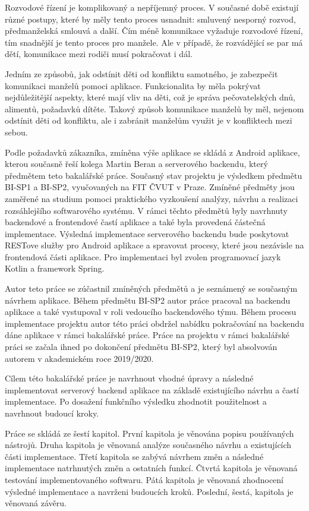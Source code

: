 Rozvodové řízení je komplikovaný a nepříjemný proces. V současné době existují různé postupy, které by měly tento proces usnadnit: smluvený nesporný rozvod, předmanželská smlouvá a další. Čím méně komunikace vyžaduje rozvodové řízení, tím snadnější je tento proces pro manžele. Ale v případě, že rozvádějící se par má dětí, komunikace mezi rodiči musí pokračovat i dál. 

Jedním ze způsobů, jak odstínit děti od konfliktu samotného, je zabezpečit komunikaci manželů pomoci aplikace. Funkcionalita by měla pokrývat nejdůležitější aspekty, které mají vliv na děti, což je správa pečovatelských dnů, alimentů, požadavků dítěte. Takový způsob komunikace manželů by měl, nejenom odstínit děti od konfliktu, ale i zabránit manželům využit je v konfliktech mezi sebou.

Podle požadavků zákazníka, zmíněna výše aplikace se skládá z Android aplikace, kterou současně řeší kolega Martin Beran a serverového backendu, který předmětem teto bakalářské práce. Současný stav projektu je výsledkem předmětu BI-SP1 a BI-SP2, vyučovaných na FIT ČVUT v Praze. Zmíněné předměty jsou zaměřené na studium pomoci praktického vyzkoušení analýzy, návrhu a realizaci rozsáhlejšího softwarového systému. V rámci těchto předmětů byly navrhnuty backendové a frontendové častí aplikace a také byla provedená částečná implementace. 
Výsledná implementace serverového backendu bude poskytovat RESTove služby pro Android aplikace a spravovat procesy, které jsou nezávisle na frontendová části aplikace. Pro implementaci byl zvolen programovací jazyk Kotlin a framework Spring. 

Autor teto práce se zúčastnil zmíněných předmětů a je seznámený se současným návrhem aplikace. Během předmětu BI-SP2 autor práce pracoval na backendu aplikace a také vystupoval v roli vedoucího backendového týmu. Během procesu implementace projektu autor této práci obdržel nabídku pokračování na backendu dáne aplikace v rámci bakalářské práce. Práce na projektu v rámci bakalářské práci se začala ihned po dokončení předmětu BI-SP2, který byl absolvován autorem v akademickém roce 2019/2020.

Cílem této bakalářské práce je navrhnout vhodné úpravy a následné implementovat serverový backend aplikace na základě existujícího návrhu a častí implementace. Po dosažení funkčního výsledku zhodnotit použitelnost a navrhnout budoucí kroky.

Práce se skládá ze šestí kapitol. První kapitola je věnována popisu používaných nástrojů. Druha kapitola je věnovaná analýze současného návrhu a existujících části implementace. Třetí kapitola se zabývá návrhem změn a následné implementace natrhnutých změn a ostatních funkcí. Čtvrtá kapitola je věnovaná testování implementovaného softwaru. Pátá kapitola je věnovaná zhodnocení výsledné implementace a navrženi budoucích kroků. Poslední, šestá, kapitola je věnovaná závěru.






